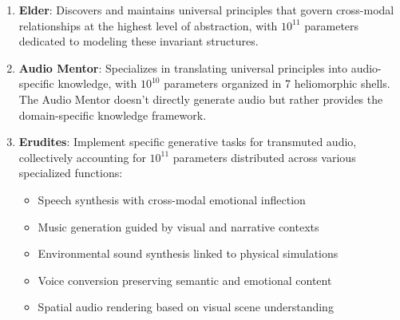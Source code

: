 \begin{enumerate}
    \item \textbf{Elder}: Discovers and maintains universal principles that govern cross-modal relationships at the highest level of abstraction, with $10^{11}$ parameters dedicated to modeling these invariant structures.
    
    \item \textbf{Audio Mentor}: Specializes in translating universal principles into audio-specific knowledge, with $10^{10}$ parameters organized in 7 heliomorphic shells. The Audio Mentor doesn't directly generate audio but rather provides the domain-specific knowledge framework.
    
    \item \textbf{Erudites}: Implement specific generative tasks for transmuted audio, collectively accounting for $10^{11}$ parameters distributed across various specialized functions:
        \begin{itemize}
            \item Speech synthesis with cross-modal emotional inflection
            \item Music generation guided by visual and narrative contexts
            \item Environmental sound synthesis linked to physical simulations
            \item Voice conversion preserving semantic and emotional content
            \item Spatial audio rendering based on visual scene understanding
        \end{itemize}
\end{enumerate}

